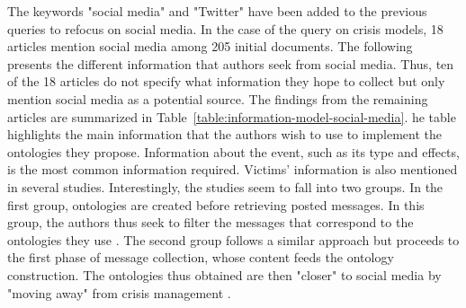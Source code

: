 The keywords "social media" and "Twitter" have been added to the previous queries to refocus on social media.
In the case of the query on crisis models, 18 articles mention social media among 205 initial documents.
The following presents the different information that authors seek from social media.
Thus, ten of the 18 articles do not specify what information they hope to collect but only mention social media as a potential source.
The findings from the remaining articles are summarized in Table~\ref{table:information-model-social-media}.
he table highlights the main information that the authors wish to use to implement the ontologies they propose.
Information about the event, such as its type and effects, is the most common information required.
Victims' information is also mentioned in several studies.
Interestingly, the studies seem to fall into two groups.
In the first group, ontologies are created before retrieving posted messages.
In this group, the authors thus seek to filter the messages that correspond to the ontologies they use \parencite{gaurEmpathiOntologyEmergency2019,moiDesignOntologyUse2016,narayanasamyCrisisDisasterSituations2019b,montarnalAutomatedEmergenceCrisis2017,cocheActionableCollaborativeCommon2019}.
The second group follows a similar approach but proceeds to the first phase of message collection, whose content feeds the ontology construction.
The ontologies thus obtained are then "closer" to social media by "moving away" from crisis management \parencite{kemavuthanonClassificationSocialMedia2020b,kawtrakulImprovingDisasterResponsiveness2012,leeConstructionEventOntology2013}.

